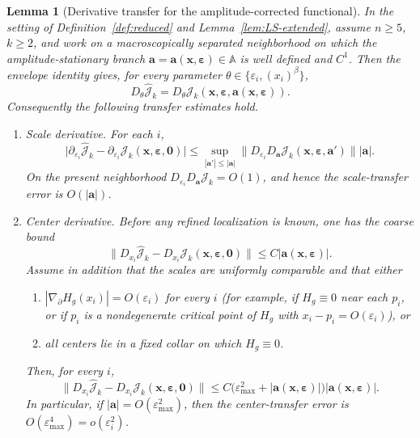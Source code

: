 \documentclass[11pt,reqno,a4paper]{amsart}
\numberwithin{equation}{section}
\theoremstyle{plain}
\newtheorem{lemma}[theorem]{Lemma}
\theoremstyle{remark}
\theoremstyle{plain}
\begin{document}
\begin{lemma}[Derivative transfer for the amplitude-corrected functional]
\label{lem:amp-derivative-transfer}
In the setting of Definition~\ref{def:reduced} and Lemma~\ref{lem:LS-extended},
assume $n\ge5$, $k\ge2$, and work on a macroscopically separated neighborhood on which the
amplitude-stationary branch
$\mathbf a=\mathbf a(\mathbf x,\boldsymbol\varepsilon)\in\mathbb A$
is well defined and $C^1$.
Then the envelope identity gives, for every parameter $\theta\in\{\varepsilon_i,(x_i)^\beta\}$,
\[
D_\theta\hat{\mathcal J}_k
=
D_\theta\mathcal J_k(\mathbf x,\boldsymbol\varepsilon,
\mathbf a(\mathbf x,\boldsymbol\varepsilon)).
\]
Consequently the following transfer estimates hold.

\begin{enumerate}[label=\textup{(\alph*)},leftmargin=1.5em]
\item \emph{Scale derivative.}
For each $i$,
\[
\big|\partial_{\varepsilon_i}\hat{\mathcal J}_k
-\partial_{\varepsilon_i}\mathcal J_k(\mathbf x,\boldsymbol\varepsilon,\mathbf 0)\big|
\le
\sup_{|\mathbf a'|\le|\mathbf a|}
\big\|D_{\varepsilon_i}D_{\mathbf a}\mathcal J_k
(\mathbf x,\boldsymbol\varepsilon,\mathbf a')\big\||\mathbf a|.
\]
On the present neighborhood
$D_{\varepsilon_i}D_{\mathbf a}\mathcal J_k=O(1)$, and hence the scale-transfer error is
$O(|\mathbf a|)$.

\item \emph{Center derivative.}
Before any refined localization is known, one has the coarse bound
\begin{equation}\label{eq:coarse-center-transfer}
\big\|D_{x_i}\hat{\mathcal J}_k
-D_{x_i}\mathcal J_k(\mathbf x,\boldsymbol\varepsilon,\mathbf 0)\big\|
\le C|\mathbf a(\mathbf x,\boldsymbol\varepsilon)|.
\end{equation}
Assume in addition that the scales are uniformly comparable and that either
\begin{enumerate}[label=\textup{(\roman*)},leftmargin=1.5em]
\item $|\nabla_\partial H_g(x_i)|=O(\varepsilon_i)$ for every $i$
(for example, if $H_g\equiv0$ near each $p_i$, or if $p_i$ is a
nondegenerate critical point of $H_g$ with $x_i-p_i=O(\varepsilon_i)$), or
\item all centers lie in a fixed collar on which $H_g\equiv0$.
\end{enumerate}
Then, for every $i$,
\begin{equation}\label{eq:refined-center-transfer}
\big\|D_{x_i}\hat{\mathcal J}_k
-D_{x_i}\mathcal J_k(\mathbf x,\boldsymbol\varepsilon,\mathbf 0)\big\|
\le C\big(\varepsilon_{\max}^2+|\mathbf a(\mathbf x,\boldsymbol\varepsilon)|\big)
|\mathbf a(\mathbf x,\boldsymbol\varepsilon)|.
\end{equation}
In particular, if $|\mathbf a|=O(\varepsilon_{\max}^2)$, then the center-transfer error is
$O(\varepsilon_{\max}^4)=o(\varepsilon_i^2)$.
\end{enumerate}
\end{lemma}
\end{document}

